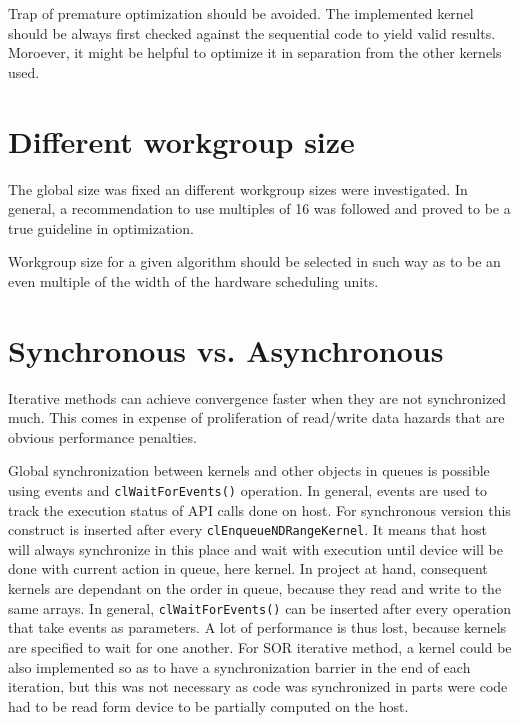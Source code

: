 Trap of premature optimization should be avoided. The implemented kernel should be always first checked against the sequential code to yield valid results. Moroever, it might be helpful to optimize it in separation from the other kernels used.

\section{Different workgroup size}
The global size was fixed an different workgroup sizes were investigated. In general, a recommendation to use multiples of 16 was followed and proved to be a true guideline in optimization.

Workgroup size for a given algorithm should be selected in such way as to be an even multiple of the width of the hardware scheduling units.

\section{Synchronous vs. Asynchronous}
Iterative methods can achieve convergence faster when they are not synchronized much. This comes in expense of proliferation of read/write data hazards that are obvious performance penalties.


Global synchronization between kernels and other objects in queues is possible using events and \texttt{clWaitForEvents()} operation. In general, events are used to track the execution status of API calls done on host. For synchronous version this construct is inserted after every \texttt{clEnqueueNDRangeKernel}. It means that host will always synchronize in this place and wait with execution until device will be done with current action in queue, here kernel. In project at hand, consequent kernels are dependant on the order in queue, because they read and write to the same arrays. In general, \texttt{clWaitForEvents()} can be inserted after every operation that take events as parameters. A lot of performance is thus lost, because kernels are specified to wait for one another. For SOR iterative method, a kernel could be also implemented so as to have a synchronization barrier in the end of each iteration, but this was not necessary as code was synchronized in parts were code had to be read form device to be partially computed on the host.

